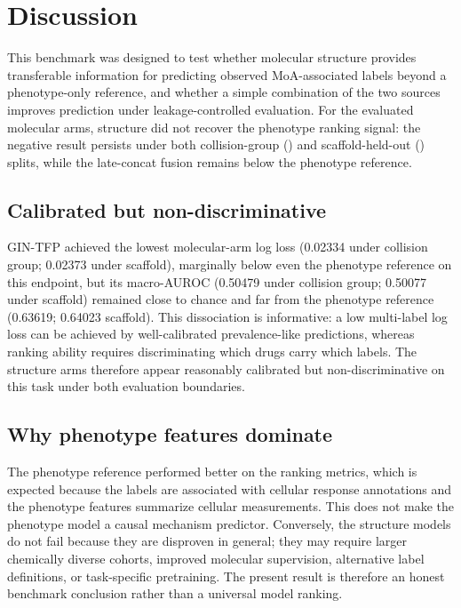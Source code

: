 \documentclass[11pt,a4paper]{article}
\begin{document}
\section{Discussion}

This benchmark was designed to test whether molecular structure provides transferable information for predicting observed MoA-associated labels beyond a phenotype-only reference, and whether a simple combination of the two sources improves prediction under leakage-controlled evaluation. For the evaluated molecular arms, structure did not recover the phenotype ranking signal: the negative result persists under both collision-group () and scaffold-held-out () splits, while the late-concat fusion remains below the phenotype reference.

\subsection{Calibrated but non-discriminative}

GIN-TFP achieved the lowest molecular-arm log loss (\num{0.02334} under collision group; \num{0.02373} under scaffold), marginally below even the phenotype reference on this endpoint, but its macro-AUROC (\num{0.50479} under collision group; \num{0.50077} under scaffold) remained close to chance and far from the phenotype reference (\num{0.63619}; \num{0.64023} scaffold). This dissociation is informative: a low multi-label log loss can be achieved by well-calibrated prevalence-like predictions, whereas ranking ability requires discriminating which drugs carry which labels. The structure arms therefore appear reasonably calibrated but non-discriminative on this task under both evaluation boundaries.

\subsection{Why phenotype features dominate}

The phenotype reference performed better on the ranking metrics, which is expected because the labels are associated with cellular response annotations and the phenotype features summarize cellular measurements. This does not make the phenotype model a causal mechanism predictor. Conversely, the structure models do not fail because they are disproven in general; they may require larger chemically diverse cohorts, improved molecular supervision, alternative label definitions, or task-specific pretraining. The present result is therefore an honest benchmark conclusion rather than a universal model ranking.
\end{document}
